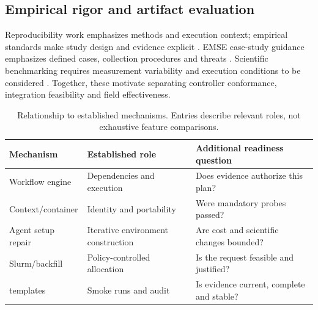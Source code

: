 \subsection{Empirical rigor and artifact evaluation}
Reproducibility work emphasizes methods and execution context; empirical standards make study design and evidence explicit \cite{pineau2021improving,ralph2021standards}. EMSE case-study guidance emphasizes defined cases, collection procedures and threats \cite{runeson2009guidelines}. Scientific benchmarking requires measurement variability and execution conditions to be considered \cite{hoefler2015scientific}. Together, these motivate separating controller conformance, integration feasibility and field effectiveness.
\begin{table}[t]
\caption{Relationship to established mechanisms. Entries describe relevant roles, not exhaustive feature comparisons.}\label{tab:position}
\small\begin{tabularx}{\textwidth}{lXX}
\toprule Mechanism & Established role & Additional readiness question \\
\midrule
Workflow engine & Dependencies and execution & Does evidence authorize this plan? \\
Context/container & Identity and portability & Were mandatory probes passed? \\
Agent setup repair & Iterative environment construction & Are cost and scientific changes bounded? \\
Slurm/backfill & Policy-controlled allocation & Is the request feasible and justified? \\
\upstream{} templates & Smoke runs and audit & Is evidence current, complete and stable? \\
\bottomrule\end{tabularx}
\end{table}
